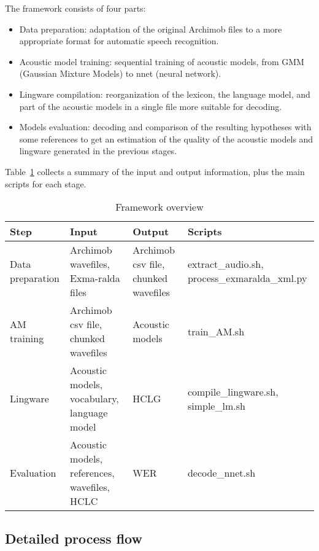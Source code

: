 \documentclass[11pt,a4paper,titlepage,twoside]{article}
\begin{document}
The framework consists of four parts:

\begin{itemize}
\item Data preparation: adaptation of the original Archimob files to a more appropriate format for automatic speech recognition.
\item Acoustic model training: sequential training of acoustic models, from GMM (Gaussian Mixture Models) to nnet (neural network).
\item Lingware compilation: reorganization of the lexicon, the language model, and part of the acoustic models in a single file more suitable for decoding.
\item Models evaluation: decoding and comparison of the resulting hypotheses with some references to get an estimation of the quality of the acoustic models and lingware generated in the previous stages.
\end{itemize}

Table~\ref{tab:framework-overview} collects a summary of the input and output information, plus the main scripts for each stage.

\begin{table}[htb!]
  \scriptsize
  \centering
  \begin{tabular}{|l|p{3.7cm}|p{2.3cm}|p{3cm}|}
    \hline
    \textbf{Step} & \textbf{Input} & \textbf{Output} & \textbf{Scripts} \\
    \hline \hline
    Data preparation & Archimob wavefiles, {Exma-ralda} files & Archimob csv file, chunked wavefiles & extract\_audio.sh, process\_exmaralda\_xml.py \\
    \hline
    AM training & Archimob csv file, chunked wavefiles & Acoustic models & train\_AM.sh \\
    \hline
    Lingware & Acoustic models, vocabulary, language model & HCLG & compile\_lingware.sh, simple\_lm.sh  \\
    \hline
    Evaluation & Acoustic models, references, wavefiles, HCLC & WER & decode\_nnet.sh \\
    \hline
  \end{tabular}
  \caption{Framework overview}
  \label{tab:framework-overview}
\end{table}

\subsection{Detailed process flow}
\label{sec:detailed-process-flow}
\end{document}
